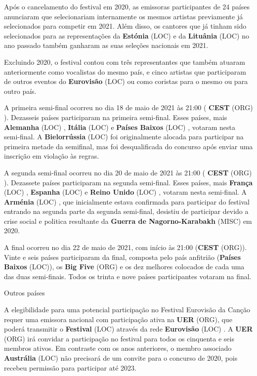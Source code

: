 \documentclass[12pt,a4paper]{article}
\begin{document}
Após o cancelamento do festival em 2020, as emissoras participantes de 24 países anunciaram que selecionariam internamente os mesmos artistas previamente já selecionados para competir em 2021. Além disso, os cantores que já tinham sido selecionados para as representações da \textbf{Estónia} (LOC) e da \textbf{Lituânia} (LOC) no ano passado também ganharam as suas seleções nacionais em 2021.

Excluindo 2020, o festival contou com três representantes que também atuaram anteriormente como vocalistas do mesmo país, e cinco artistas que participaram de outros eventos do \textbf{Eurovisão} (LOC) ou como coristas para o mesmo ou para outro país.

A primeira semi-final ocorreu no dia 18 de maio de 2021 às 21:00 ( \textbf{CEST} (ORG) ). Dezasseis países participaram na primeira semi-final. Esses países, mais \textbf{Alemanha} (LOC) , \textbf{Itália} (LOC) e \textbf{Países Baixos} (LOC) , votaram nesta semi-final. A \textbf{Bielorrússia} (LOC) foi originalmente alocada para participar na primeira metade da semifinal, mas foi desqualificada do concurso após enviar uma inscrição em violação às regras.

A segunda semi-final ocorreu no dia 20 de maio de 2021 às 21:00 ( \textbf{CEST} (ORG) ). Dezassete países participaram na segunda semi-final. Esses países, mais \textbf{França} (LOC) , \textbf{Espanha} (LOC) e \textbf{Reino Unido} (LOC) , votaram nesta semi-final. A \textbf{Arménia} (LOC) , que inicialmente estava confirmada para participar do festival entrando na segunda parte da segunda semi-final, desistiu de participar devido a crise social e politica resultante da \textbf{Guerra de Nagorno-Karabakh} (MISC) em 2020.

A final ocorreu no dia 22 de maio de 2021, com início às 21:00 (\textbf{CEST} (ORG)). Vinte e seis países participaram da final, composta pelo país anfitrião (\textbf{Países Baixos} (LOC)), os \textbf{Big Five} (ORG) e os dez melhores colocados de cada uma das duas semi-finais. Todos os trinta e nove países participantes votaram na final.



Outros países

A elegibilidade para uma potencial participação no Festival Eurovisão da Canção requer uma emissora nacional com participação ativa na \textbf{UER} (ORG), que poderá transmitir o \textbf{Festival} (LOC) através da rede \textbf{Eurovisão} (LOC) . A \textbf{UER} (ORG) irá convidar a participação no festival para todos os cinquenta e seis membros ativos. Em contraste com os anos anteriores, o membro associado \textbf{Austrália} (LOC) não precisará de um convite para o concurso de 2020, pois recebeu permissão para participar até 2023.
\end{document}
